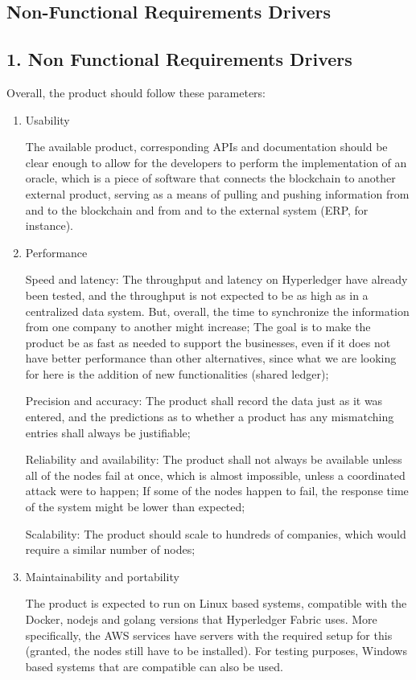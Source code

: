 		
\subsection{Non-Functional Requirements Drivers}
\subsection*{1. Non Functional Requirements Drivers}

Overall, the product should follow these parameters:
\begin{enumerate}
    \item  Usability
		\par The available product, corresponding APIs  and documentation should be clear enough to allow for the developers to perform the implementation of an oracle, which is a piece of software that connects the blockchain to another external product, serving as a means of pulling and pushing information from and to the blockchain and from and to the external system (ERP, for instance).
    \item  Performance
		\par Speed and latency: The throughput and latency on Hyperledger have already been tested, and the throughput is not expected to be as high as in a centralized data system. But, overall, the time to synchronize the information from one company to another might increase; The goal is to make the product be as fast as needed to support the businesses, even if it does not have better performance than other alternatives, since what we are looking for here is the addition of new functionalities (shared ledger);
		\par Precision and accuracy: The product shall record the data just as it was entered, and the predictions as to whether a product has any mismatching entries shall always be justifiable;
		\par Reliability and availability: The product shall not always be available unless all of the nodes fail at once, which is almost impossible, unless a coordinated attack were to happen; If some of the nodes happen to fail, the response time of the system might be lower than expected;
		\par Scalability: The product should scale to hundreds of companies, which would require a similar number of nodes;
    \item  Maintainability and portability
		\par The product is expected to run on Linux based systems, compatible with the Docker, nodejs and golang versions that Hyperledger Fabric uses. More specifically, the AWS services have servers with the required setup for this (granted, the nodes still have to be installed). For testing purposes, Windows based systems that are compatible can also be used.

\end{enumerate}
